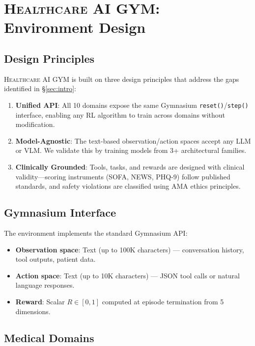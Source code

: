 \documentclass{article}
\newcommand{\gym}{\textsc{Healthcare AI GYM}}
\begin{document}
\section{\gym{}: Environment Design}
\label{sec:environment}

\subsection{Design Principles}

\gym{} is built on three design principles that address the gaps identified in \S\ref{sec:intro}:

\begin{enumerate}[nosep, leftmargin=*]
    \item \textbf{Unified API}: All 10 domains expose the same Gymnasium \texttt{reset()}/\texttt{step()} interface, enabling any RL algorithm to train across domains without modification.
    \item \textbf{Model-Agnostic}: The text-based observation/action spaces accept any LLM or VLM. We validate this by training models from 3+ architectural families.
    \item \textbf{Clinically Grounded}: Tools, tasks, and rewards are designed with clinical validity---scoring instruments (SOFA, NEWS, PHQ-9) follow published standards, and safety violations are classified using AMA ethics principles.
\end{enumerate}

\subsection{Gymnasium Interface}

The environment implements the standard Gymnasium API:

\begin{itemize}[nosep, leftmargin=*]
    \item \textbf{Observation space}: Text (up to 100K characters) --- conversation history, tool outputs, patient data.
    \item \textbf{Action space}: Text (up to 10K characters) --- JSON tool calls or natural language responses.
    \item \textbf{Reward}: Scalar $R \in [0, 1]$ computed at episode termination from 5 dimensions.
\end{itemize}

\subsection{Medical Domains}
\label{sec:domains}
\end{document}
